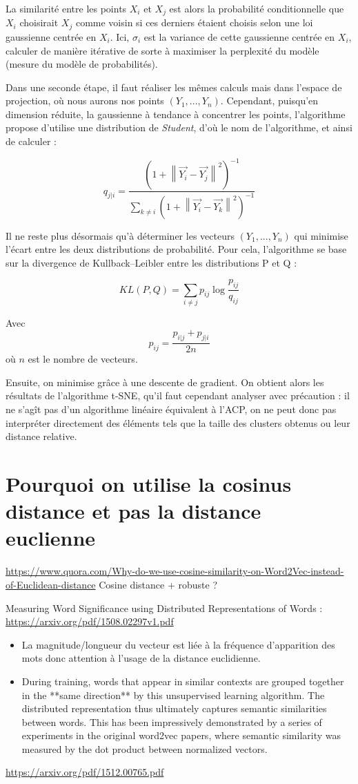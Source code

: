 \documentclass[11pt,french,french]{article}
\begin{document}
La similarité entre les points \(X_i\) et \(X_j\) est alors la
probabilité conditionnelle que \(X_i\) choisirait \(X_j\) comme voisin
si ces derniers étaient choisis selon une loi gaussienne centrée en
\(X_i\). Ici, \(\sigma_i\) est la variance de cette gaussienne centrée
en \(X_i\), calculer de manière itérative de sorte à maximiser la
perplexité du modèle (mesure du modèle de probabilités).

Dans une seconde étape, il faut réaliser les mêmes calculs mais dans
l'espace de projection, où nous aurons nos points \((Y_1,..., Y_n)\).
Cependant, puisqu'en dimension réduite, la gaussienne à tendance à
concentrer les points, l'algorithme propose d'utilise une distribution
de \emph{Student}, d'où le nom de l'algorithme, et ainsi de calculer :

\[ q_{j|i} = \frac{(1+\left\| \vec{Y_i} - \vec{Y_j}  \right\|^2)^{-1}}{\sum_{k \neq i}{(1+\left\| \vec{Y_i} - \vec{Y_k}  \right\|^2)^{-1}}}\]

Il ne reste plus désormais qu'à déterminer les vecteurs
\((Y_1,...,Y_n)\) qui minimise l'écart entre les deux distributions de
probabilité. Pour cela, l'algorithme se base sur la divergence de
Kullback--Leibler entre les distributions P et Q :

\[KL(P,Q) = \sum_{i \neq j} { p_{ij} \log{\frac{p_{ij}}{q_{ij}}}}\]

Avec \[p_{ij} = \frac{p_{i|j} + p_{j|i}}{2n}\] où \(n\) est le nombre de
vecteurs.

Ensuite, on minimise grâce à une descente de gradient. On obtient alors
les résultats de l'algorithme t-SNE, qu'il faut cependant analyser avec
précaution : il ne s'agît pas d'un algorithme linéaire équivalent à
l'ACP, on ne peut donc pas interpréter directement des éléments tels que
la taille des clusters obtenus ou leur distance relative.

\section{Pourquoi on utilise la cosinus distance et pas la distance
euclienne}\label{pourquoi-on-utilise-la-cosinus-distance-et-pas-la-distance-euclienne}

\url{https://www.quora.com/Why-do-we-use-cosine-similarity-on-Word2Vec-instead-of-Euclidean-distance}
Cosine distance + robuste ?

Measuring Word Significance using Distributed Representations of Words :
\url{https://arxiv.org/pdf/1508.02297v1.pdf}

\begin{itemize}
\item La magnitude/longueur du vecteur est liée à la fréquence d'apparition des mots donc attention à l'usage de la distance euclidienne.
\item During training, words that appear in similar contexts are grouped together in the **same direction** by this unsupervised learning algorithm. 
The distributed representation thus ultimately captures semantic similarities between words. 
This has been impressively demonstrated by a series of experiments in the original word2vec papers, where semantic similarity was measured by the dot product between normalized vectors.
\end{itemize}

\url{https://arxiv.org/pdf/1512.00765.pdf}
\end{document}
